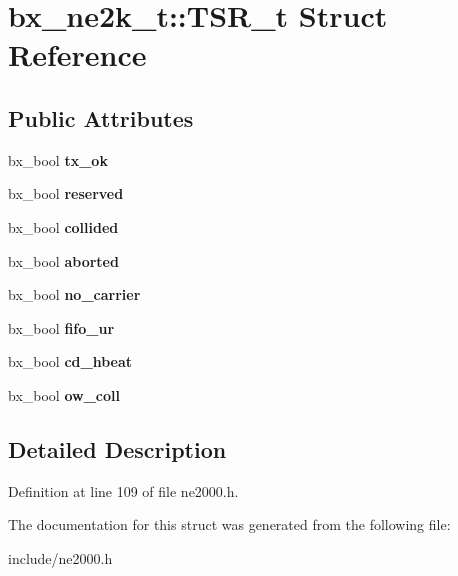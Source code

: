 \hypertarget{structbx__ne2k__t_1_1TSR__t}{\section{bx\-\_\-ne2k\-\_\-t\-:\-:T\-S\-R\-\_\-t Struct Reference}
\label{structbx__ne2k__t_1_1TSR__t}
}
\subsection*{Public Attributes}
\begin{DoxyCompactItemize}
\item 
\hypertarget{structbx__ne2k__t_1_1TSR__t_a2e9d0a6d9e58b109b7ce8e4ac98a0332}{bx\-\_\-bool {\bfseries tx\-\_\-ok}}\label{structbx__ne2k__t_1_1TSR__t_a2e9d0a6d9e58b109b7ce8e4ac98a0332}

\item 
\hypertarget{structbx__ne2k__t_1_1TSR__t_a7282f687e26ad6b7889f8bbd848a5589}{bx\-\_\-bool {\bfseries reserved}}\label{structbx__ne2k__t_1_1TSR__t_a7282f687e26ad6b7889f8bbd848a5589}

\item 
\hypertarget{structbx__ne2k__t_1_1TSR__t_a68fbe9e6fc76c091e34daa61ca85a3e0}{bx\-\_\-bool {\bfseries collided}}\label{structbx__ne2k__t_1_1TSR__t_a68fbe9e6fc76c091e34daa61ca85a3e0}

\item 
\hypertarget{structbx__ne2k__t_1_1TSR__t_ad319ec27cf874c35ed847b01df20fee1}{bx\-\_\-bool {\bfseries aborted}}\label{structbx__ne2k__t_1_1TSR__t_ad319ec27cf874c35ed847b01df20fee1}

\item 
\hypertarget{structbx__ne2k__t_1_1TSR__t_a2885308119725d215d2969288bb7c6b3}{bx\-\_\-bool {\bfseries no\-\_\-carrier}}\label{structbx__ne2k__t_1_1TSR__t_a2885308119725d215d2969288bb7c6b3}

\item 
\hypertarget{structbx__ne2k__t_1_1TSR__t_a5970d4ac3e34691870eabc5dc9d4bf93}{bx\-\_\-bool {\bfseries fifo\-\_\-ur}}\label{structbx__ne2k__t_1_1TSR__t_a5970d4ac3e34691870eabc5dc9d4bf93}

\item 
\hypertarget{structbx__ne2k__t_1_1TSR__t_ac7a760fc2bff7a1889100c0ee7ba5701}{bx\-\_\-bool {\bfseries cd\-\_\-hbeat}}\label{structbx__ne2k__t_1_1TSR__t_ac7a760fc2bff7a1889100c0ee7ba5701}

\item 
\hypertarget{structbx__ne2k__t_1_1TSR__t_a989dfbc323a5c1c9679aba0db22d95d1}{bx\-\_\-bool {\bfseries ow\-\_\-coll}}\label{structbx__ne2k__t_1_1TSR__t_a989dfbc323a5c1c9679aba0db22d95d1}

\end{DoxyCompactItemize}


\subsection{Detailed Description}


Definition at line 109 of file ne2000.\-h.



The documentation for this struct was generated from the following file\-:\begin{DoxyCompactItemize}
\item 
include/ne2000.\-h\end{DoxyCompactItemize}
